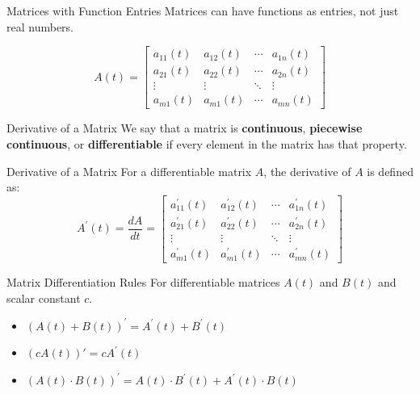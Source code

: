 \documentclass{beamer}
\begin{document}
\begin{frame}{Matrices with Function Entries}
Matrices can have functions as entries, not just real numbers.
\begin{example}
\begin{equation*}
A(t)=\begin{bmatrix}
a_{11}(t)&a_{12}(t)&\cdots&a_{1n}(t)\\
a_{21}(t)&a_{22}(t)&\cdots&a_{2n}(t)\\
\vdots&\vdots&\ddots&\vdots\\
a_{m1}(t)&a_{m1}(t)&\cdots&a_{mn}(t)
\end{bmatrix}
\end{equation*}
\end{example}
\end{frame}

\begin{frame}{Derivative of a Matrix}
We say that a matrix is \textbf{continuous}, \textbf{piecewise continuous}, or \textbf{differentiable} if every element in the matrix has that property.\pause
\begin{block}{Derivative of a Matrix}
For a differentiable matrix $A$, the derivative of $A$ is defined as:
\begin{equation*}
A^\prime(t)=\dfrac{dA}{dt}=
\begin{bmatrix}
a_{11}^\prime(t)&a_{12}^\prime(t)&\cdots&a_{1n}^\prime(t)\\
a_{21}^\prime(t)&a_{22}^\prime(t)&\cdots&a_{2n}^\prime(t)\\
\vdots&\vdots&\ddots&\vdots\\
a_{m1}^\prime(t)&a_{m1}^\prime(t)&\cdots&a_{mn}^\prime(t)
\end{bmatrix}
\end{equation*}
\end{block}\pause
\begin{block}{Matrix Differentiation Rules}
For differentiable matrices $A(t)$ and $B(t)$ and scalar constant $c$.
\begin{itemize}
\item ${\left(A(t)+B(t)\right)}^\prime=A^\prime(t)+B^\prime(t)$
\item $\left(cA(t)\right)\prime=cA^\prime(t)$
\item ${\left(A(t)\cdot B(t)\right)}^\prime=A(t)\cdot B^\prime(t)+A^\prime(t)\cdot  B(t)$
\end{itemize}
\end{block}
\end{frame}
\end{document}
